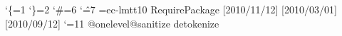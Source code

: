 \catcode`\{=1 %
\catcode`\}=2 %
\catcode`\#=6 %
\catcode`\^=7 %
\font\rmfont=ec-lmtt10\relax
\rmfont
{} %
\begingroup\expandafter\expandafter\expandafter\endgroup
\expandafter\ifx\csname RequirePackage\endcsname\relax
  \relax
\else
  \RequirePackage{rotchiffre}[2010/11/12]%
  \RequirePackage{ifluatex}[2010/03/01]%
  \RequirePackage{ifxetex}[2010/09/12]%
\fi
\catcode`\@=11 %
\begingroup\expandafter\expandafter\expandafter\endgroup
\expandafter\ifx\csname @onelevel@sanitize\endcsname\relax
  \begingroup\expandafter\expandafter\expandafter\endgroup
  \expandafter\ifx\csname detokenize\endcsname\relax
    \def\strip@prefix#1->{}%
    \def\@onelevel@sanitize#1{%
      \edef#1{%
        \expandafter\strip@prefix\meaning#1%
      }%
    }%
  \else
    \def\@onelevel@sanitize#1{%
      \edef#1{%
        \detokenize\expandafter{#1}%
      }%
    }%
  \fi
\fi
\def\msg#{\immediate\write16}
\def\empty{}
\begingroup
  \def\x#1{%
    \def\space{#1}%
    \def\spacesII{#1#1}%
    \def\spacesIII{#1#1#1}%
    \def\spacesIV{#1#1#1#1}%
  }%
\expandafter\endgroup\x{ }
\def\PrintStr#1#2{%
  \begingroup
    \@onelevel@sanitize#2%
    \msg{#1: [#2]}%
  \endgroup
}
\def\CheckResult{%
  \PrintStr{Result}\StrResult
  \ifx\StrExpect\StrResult
    \msg{==> Ok}%
  \else
    \begingroup
    \edef\x{\endgroup
      \errmessage{Test failed (\chiffre)!}%
    }\x
  \fi
}
